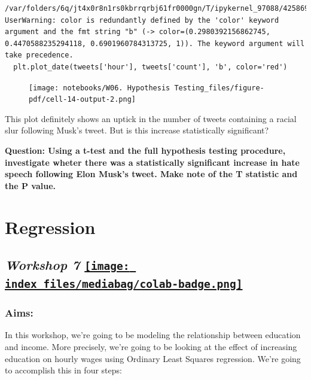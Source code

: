 \documentclass[
  letterpaper,
  DIV=11,
  numbers=noendperiod]{scrreprt}
\begin{document}
\begin{verbatim}
/var/folders/6q/jt4x0r8n1rs0kbrrqrbj61fr0000gn/T/ipykernel_97088/4258694155.py:17: UserWarning: color is redundantly defined by the 'color' keyword argument and the fmt string "b" (-> color=(0.2980392156862745, 0.4470588235294118, 0.6901960784313725, 1)). The keyword argument will take precedence.
  plt.plot_date(tweets['hour'], tweets['count'], 'b', color='red')
\end{verbatim}

\begin{figure}[H]

{\centering \texttt{[image: notebooks/W06. Hypothesis Testing\_files/figure-pdf/cell-14-output-2.png]}

}

\end{figure}

This plot definitely shows an uptick in the number of tweets containing
a racial slur following Musk's tweet. But is this increase statistically
significant?

\textbf{Question: Using a t-test and the full hypothesis testing
procedure, investigate wheter there was a statistically significant
increase in hate speech following Elon Musk's tweet. Make note of the T
statistic and the P value.}


\hypertarget{regression}{%
\chapter{Regression}\label{regression}}

\hypertarget{workshop-7-open-in-colab}{%
\section[\emph{Workshop 7} ]{\texorpdfstring{\emph{Workshop 7}
\href{https://colab.research.google.com/github/oballinger/QM2/blob/main/notebooks/W07.\%20Linear\%20Regression.ipynb}{\protect\texttt{[image: index\_files/mediabag/colab-badge.png]}}}{Workshop 7 Open In Colab}}\label{workshop-7-open-in-colab}}

\hypertarget{aims-5}{%
\subsection{Aims:}\label{aims-5}}

In this workshop, we're going to be modeling the relationship between
education and income. More precisely, we're going to be looking at the
effect of increasing education on hourly wages using Ordinary Least
Squares regression. We're going to accomplish this in four steps:
\end{document}
